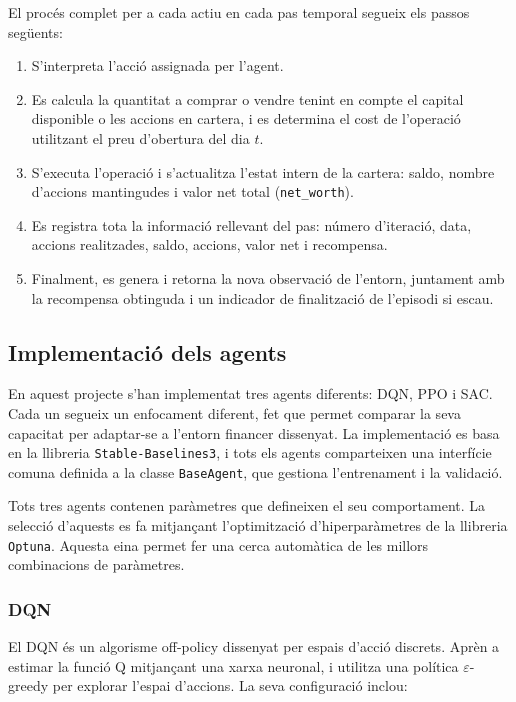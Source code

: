 \documentclass[12pt,a4paper,twoside]{book}
\begin{document}
El procés complet per a cada actiu en cada pas temporal segueix els passos següents:

\begin{enumerate}
    \item S'interpreta l'acció assignada per l'agent.
    \item Es calcula la quantitat a comprar o vendre tenint en compte el capital disponible o les accions en cartera, i es determina el cost de l'operació utilitzant el preu d'obertura del dia $t$.
    \item S'executa l'operació i s'actualitza l'estat intern de la cartera: saldo, nombre d'accions mantingudes i valor net total (\texttt{net\_worth}).
    \item Es registra tota la informació rellevant del pas: número d'iteració, data, accions realitzades, saldo, accions, valor net i recompensa.
    \item Finalment, es genera i retorna la nova observació de l'entorn, juntament amb la recompensa obtinguda i un indicador de finalització de l'episodi si escau.
\end{enumerate}


\subsection{Implementació dels agents}

En aquest projecte s'han implementat tres agents diferents: DQN, PPO i SAC. Cada un segueix un enfocament diferent, fet que permet comparar la seva capacitat per adaptar-se a l'entorn financer dissenyat. La implementació es basa en la llibreria \texttt{Stable-Baselines3}, i tots els agents comparteixen una interfície comuna definida a la classe \texttt{BaseAgent}, que gestiona l'entrenament i la validació.

Tots tres agents contenen paràmetres que defineixen el seu comportament. La selecció d'aquests es fa mitjançant l'optimització d'hiperparàmetres de la llibreria \texttt{Optuna}. Aquesta eina permet fer una cerca automàtica de les millors combinacions de paràmetres.

\subsubsection{DQN}

El DQN és un algorisme off-policy dissenyat per espais d'acció discrets. Aprèn a estimar la funció Q mitjançant una xarxa neuronal, i utilitza una política $\varepsilon$-greedy per explorar l'espai d'accions. La seva configuració inclou:
\end{document}
